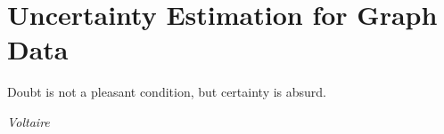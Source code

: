 \chapter{Uncertainty Estimation for Graph Data}
\label{chap:graph_data}

\epigraph{Doubt is not a pleasant condition, but certainty is absurd.}{\textit{Voltaire}}







